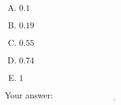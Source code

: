 \documentclass[10pt]{amsart}
\begin{document}
\begin{enumerate}
  \begin{enumerate}[(A)]
  \item $0.1$
  \item $0.19$
  \item $0.55$
  \item $0.74$
  \item $1$
  \end{enumerate}

  \vspace{0.1in}
  Your answer: $\underline{\qquad\qquad\qquad\qquad\qquad\qquad\qquad}$
  \vspace{0.6in}

\end{enumerate}
\end{document}
